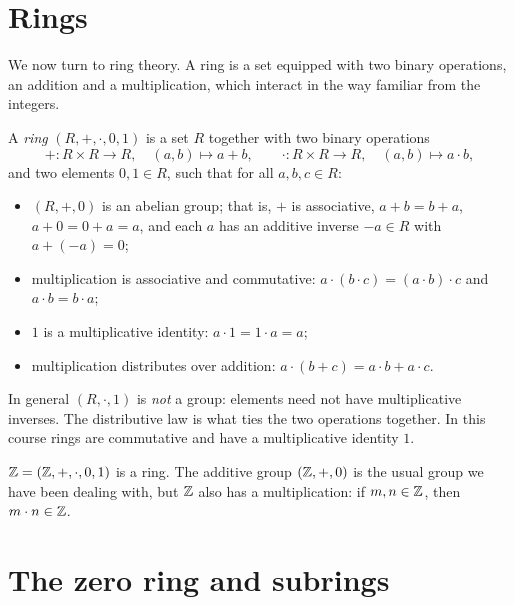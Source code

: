 \documentclass[reqno,11pt]{amsart}
\begin{document}
\raggedbottom
\makelecturetitle



\section{Rings}

We now turn to ring theory. A ring is a set equipped with two
binary operations, an addition and a multiplication, which interact
in the way familiar from the integers.

\begin{define}[Ring]
A \emph{ring} $(R,+,\cdot,0,1)$ is a set $R$ together with two
binary operations
\[
  +:R\times R\to R,\quad (a,b)\mapsto a+b,
  \qquad
  \cdot:R\times R\to R,\quad (a,b)\mapsto a\cdot b,
\]
and two elements $0,1\in R$, such that for all $a,b,c\in R$:
\begin{itemize}
  \item $(R,+,0)$ is an abelian group; that is, $+$ is associative,
    $a+b=b+a$, $a+0=0+a=a$, and each $a$ has an additive inverse
    $-a\in R$ with $a+(-a)=0$;
  \item multiplication is associative and commutative:
    $a\cdot(b\cdot c)=(a\cdot b)\cdot c$ and $a\cdot b=b\cdot a$;
  \item $1$ is a multiplicative identity: $a\cdot1=1\cdot a=a$;
  \item multiplication distributes over addition:
    $a\cdot(b+c)=a\cdot b+a\cdot c$.
\end{itemize}
\end{define}

\begin{remark}
In general $(R,\cdot,1)$ is \emph{not} a group: elements need not
have multiplicative inverses. The distributive law is what ties the
two operations together. In this course rings are commutative and
have a multiplicative identity $1$.
\end{remark}

\begin{example}
$\mathbb{Z}=(\mathbb{Z},+,\cdot,0,1)$ is a ring. The additive group $(\mathbb{Z},+,0)$ is
the usual group we have been dealing with, but $\mathbb{Z}$ also has a
multiplication: if $m,n\in\mathbb{Z}$, then $m\cdot n\in\mathbb{Z}$.
\end{example}

\section{The zero ring and subrings}
\end{document}
